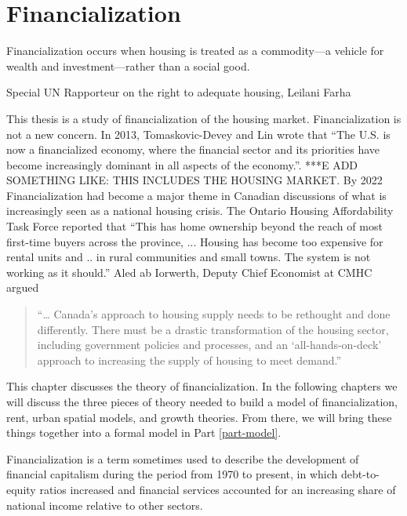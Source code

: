 \chapter{Financialization} \label{chapter-financialization}
\epigraph{Financialization  occurs when housing is treated as a commodity—a vehicle for wealth and investment—rather than a social good.}{Special UN Rapporteur on the right to adequate housing, Leilani Farha}


This thesis is a study of financialization of the housing market. Financialization is not a new concern. In 2013, Tomaskovic-Devey and Lin wrote that ``The U.S. is now a financialized economy, where the financial sector and its priorities have become increasingly dominant in all aspects of the economy.''\cite{tomaskovic-deveyFinancializationCausesInequality2013}. ***E ADD SOMETHING LIKE: THIS INCLUDES THE HOUSING MARKET. By 2022 Financialization had become a major theme in Canadian  discussions of what is increasingly seen as a national housing crisis. The Ontario Housing Affordability Task Force reported that ``This has home ownership beyond the reach of most first-time buyers across the province, ... Housing has become too expensive for rental units and ..  in rural communities and small towns. The system is not working as it should.''   Aled ab Iorwerth, Deputy Chief Economist at CMHC argued
\begin{quotation}
     “… Canada’s approach to housing supply needs to be rethought and done differently. There must be a drastic transformation of the housing sector, including government policies and processes, and an ‘all-hands-on-deck’ approach to increasing the supply of housing to meet demand.”\cite{CanadaHousingSupply2022}
\end{quotation}

This chapter discusses the theory of financialization. In the following chapters we will discuss the three pieces of theory needed to build a model of financialization, rent, urban spatial models, and growth theories. From there, we will bring these things together into a formal model in Part \ref{part-model}.

Financialization is a term %
sometimes used to describe the development of financial capitalism during the period from 1970 to present, in which debt-to-equity ratios increased and financial services accounted for an increasing share of national income relative to other sectors. %

